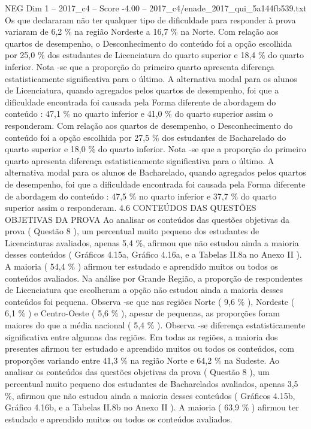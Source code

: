 \begin{textsample}{NEG Dim 1 – 2017\_c4 – Score -4.00 – 2017\_c4/enade\_2017\_qui\_5a144fb539.txt}
Os que declararam não ter qualquer tipo de dificuldade para responder à prova variaram de 6,2 \% na região Nordeste a 16,7 \% na Norte.
Com relação aos quartos de desempenho, o Desconhecimento do conteúdo foi a opção escolhida por 25,0 \% dos estudantes de Licenciatura do quarto superior e 18,4 \% do quarto inferior.
Nota -se que a proporção do primeiro quarto apresenta diferença estatisticamente significativa para o último.
A alternativa modal para os alunos de Licenciatura, quando agregados pelos quartos de desempenho, foi que a dificuldade encontrada foi causada pela Forma diferente de abordagem do conteúdo : 47,1 \% no quarto inferior e 41,0 \% do quarto superior assim o responderam.
Com relação aos quartos de desempenho, o Desconhecimento do conteúdo foi a opção escolhida por 27,5 \% dos estudantes de Bacharelado do quarto superior e 18,0 \% do quarto inferior.
Nota -se que a proporção do primeiro quarto apresenta diferença estatisticamente significativa para o último.
A alternativa modal para os alunos de Bacharelado, quando agregados pelos quartos de desempenho, foi que a dificuldade encontrada foi causada pela Forma diferente de abordagem do conteúdo : 47,5 \% no quarto inferior e 37,7 \% do quarto superior assim o responderam. 4.6 CONTEÚDOS DAS QUESTÕES OBJETIVAS DA PROVA Ao analisar os conteúdos das questões objetivas da prova ( Questão 8 ), um percentual muito pequeno dos estudantes de Licenciaturas avaliados, apenas 5,4 \%, afirmou que não estudou ainda a maioria desses conteúdos ( Gráficos 4.15a, Gráfico 4.16a, e a Tabelas II.8a no Anexo II ).
A maioria ( 54,4 \% ) afirmou ter estudado e aprendido muitos ou todos os conteúdos avaliados.
Na análise por Grande Região, a proporção de respondentes de Licenciatura que escolheram a opção não estudou ainda a maioria desses conteúdos foi pequena.
Observa -se que nas regiões Norte ( 9,6 \% ), Nordeste ( 6,1 \% ) e Centro-Oeste ( 5,6 \% ), apesar de pequenas, as proporções foram maiores do que a média nacional ( 5,4 \% ).
Observa -se diferença estatisticamente significativa entre algumas das regiões.
Em todas as regiões, a maioria dos presentes afirmou ter estudado e aprendido muitos ou todos os conteúdos, com proporções variando entre 41,3 \% na região Norte e 64,2 \% na Sudeste.
Ao analisar os conteúdos das questões objetivas da prova ( Questão 8 ), um percentual muito pequeno dos estudantes de Bacharelados avaliados, apenas 3,5 \%, afirmou que não estudou ainda a maioria desses conteúdos ( Gráficos 4.15b, Gráfico 4.16b, e a Tabelas II.8b no Anexo II ).
A maioria ( 63,9 \% ) afirmou ter estudado e aprendido muitos ou todos os conteúdos avaliados.

\end{textsample}
